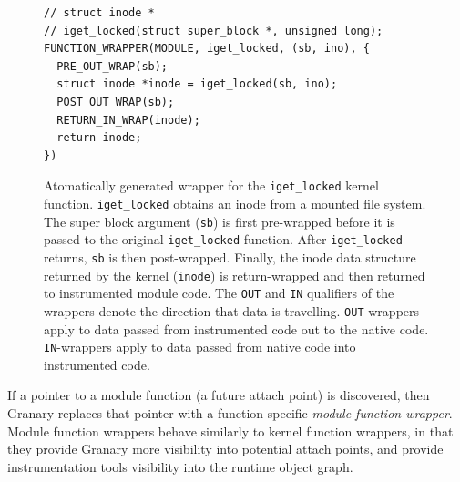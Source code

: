 \documentclass[preprint]{sigplanconf}
\begin{document}
\begin{figure}[t]
\lstset{language=C, tabsize=2, stepnumber=1}
\begin{lstlisting}[basicstyle=\scriptsize\ttfamily]
// struct inode *
// iget_locked(struct super_block *, unsigned long);
FUNCTION_WRAPPER(MODULE, iget_locked, (sb, ino), {
  PRE_OUT_WRAP(sb);
  struct inode *inode = iget_locked(sb, ino);
  POST_OUT_WRAP(sb);
  RETURN_IN_WRAP(inode);
  return inode;
})
\end{lstlisting}
\caption{\label{fig:function_wrapper}Atomatically generated wrapper for the \texttt{iget\_locked} kernel function. \texttt{iget\_locked} obtains an inode from a mounted file system. The super block argument (\texttt{sb}) is first pre-wrapped before it is passed to the original \texttt{iget\_locked} function. After \texttt{iget\_locked} returns, \texttt{sb} is then post-wrapped. Finally, the inode data structure returned by the kernel (\texttt{inode}) is return-wrapped and then returned to instrumented module code. The \texttt{OUT} and \texttt{IN} qualifiers of the wrappers denote the direction that data is travelling. \texttt{OUT}-wrappers apply to data passed from instrumented code out to the native code. \texttt{IN}-wrappers apply to data passed from native code into instrumented code.}
\end{figure}

If a pointer to a module function (a future attach point) is discovered, then Granary replaces that pointer with a function-specific \emph{module function wrapper}. Module function wrappers behave similarly to kernel function wrappers, in that they provide Granary more visibility into potential attach points, and provide instrumentation tools visibility into the runtime object graph.

\label{sec:wrappers}
\end{document}

